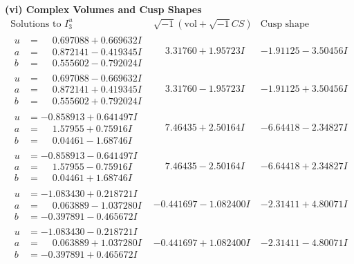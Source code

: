 \documentclass[1p]{elsarticle_modified}
\theoremstyle{definition}
\newcommand{\I}{\sqrt{-1}}
\begin{document}
\newpage\flushleft \textbf{(vi) Complex Volumes and Cusp Shapes}
$$\begin{array}{c|c|c}  
\text{Solutions to }I^u_{3}& \I (\text{vol} + \sqrt{-1}CS) & \text{Cusp shape}\\
 \hline 
\begin{aligned}
u &= \phantom{-}0.697088 + 0.669632 I \\
a &= \phantom{-}0.872141 - 0.419345 I \\
b &= \phantom{-}0.555602 - 0.792024 I\end{aligned}
 & \phantom{-}3.31760 + 1.95723 I & -1.91125 - 3.50456 I \\ \hline\begin{aligned}
u &= \phantom{-}0.697088 - 0.669632 I \\
a &= \phantom{-}0.872141 + 0.419345 I \\
b &= \phantom{-}0.555602 + 0.792024 I\end{aligned}
 & \phantom{-}3.31760 - 1.95723 I & -1.91125 + 3.50456 I \\ \hline\begin{aligned}
u &= -0.858913 + 0.641497 I \\
a &= \phantom{-}1.57955 + 0.75916 I \\
b &= \phantom{-}0.04461 - 1.68746 I\end{aligned}
 & \phantom{-}7.46435 + 2.50164 I & -6.64418 - 2.34827 I \\ \hline\begin{aligned}
u &= -0.858913 - 0.641497 I \\
a &= \phantom{-}1.57955 - 0.75916 I \\
b &= \phantom{-}0.04461 + 1.68746 I\end{aligned}
 & \phantom{-}7.46435 - 2.50164 I & -6.64418 + 2.34827 I \\ \hline\begin{aligned}
u &= -1.083430 + 0.218721 I \\
a &= \phantom{-}0.063889 - 1.037280 I \\
b &= -0.397891 - 0.465672 I\end{aligned}
 & -0.441697 - 1.082400 I & -2.31411 + 4.80071 I \\ \hline\begin{aligned}
u &= -1.083430 - 0.218721 I \\
a &= \phantom{-}0.063889 + 1.037280 I \\
b &= -0.397891 + 0.465672 I\end{aligned}
 & -0.441697 + 1.082400 I & -2.31411 - 4.80071 I \\ \hline\begin{aligned}

\end{aligned}
\end{array}$$
\end{document}
